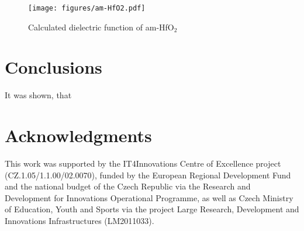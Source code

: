 \documentclass[10pt,a4paper,twocolumn]{article}
\begin{document}
\begin{figure}
\begin{center}
	\texttt{[image: figures/am-HfO2.pdf]}
	\caption{Calculated dielectric function of am-HfO$_2$}
   \label{eps-amHfO2}
\end{center}
\end{figure}


\section{Conclusions}

It was shown, that 

\section*{Acknowledgments}
This work was supported by the IT4Innovations Centre of Excellence project (CZ.1.05/1.1.00/02.0070), funded by the European Regional Development Fund and the national budget of the Czech Republic via the Research and Development for Innovations Operational Programme, as well as Czech Ministry of Education, Youth and Sports via the project Large Research, Development and Innovations Infrastructures (LM2011033).



\end{document}
